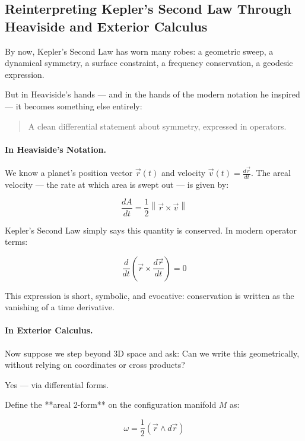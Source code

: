 \subsection*{Reinterpreting Kepler’s Second Law Through Heaviside and Exterior Calculus}

By now, Kepler’s Second Law has worn many robes:  
a geometric sweep, a dynamical symmetry, a surface constraint, a frequency conservation, a geodesic expression.

But in Heaviside’s hands — and in the hands of the modern notation he inspired —  
it becomes something else entirely:

\begin{quote}
A clean differential statement about symmetry, expressed in operators.
\end{quote}

\bigskip

\paragraph{In Heaviside’s Notation.}

We know a planet’s position vector \( \vec{r}(t) \) and velocity \( \vec{v}(t) = \frac{d\vec{r}}{dt} \).  
The areal velocity — the rate at which area is swept out — is given by:

\[
\frac{dA}{dt} = \frac{1}{2} \left\| \vec{r} \times \vec{v} \right\|
\]

Kepler’s Second Law simply says this quantity is conserved.  
In modern operator terms:

\[
\frac{d}{dt} \left( \vec{r} \times \frac{d\vec{r}}{dt} \right) = 0
\]

This expression is short, symbolic, and evocative:  
conservation is written as the vanishing of a time derivative.

\bigskip

\paragraph{In Exterior Calculus.}

Now suppose we step beyond 3D space and ask:  
Can we write this geometrically, without relying on coordinates or cross products?

Yes — via differential forms.

Define the **areal 2-form** on the configuration manifold \( M \) as:

\[
\omega = \frac{1}{2} (\vec{r} \wedge d\vec{r})
\]

